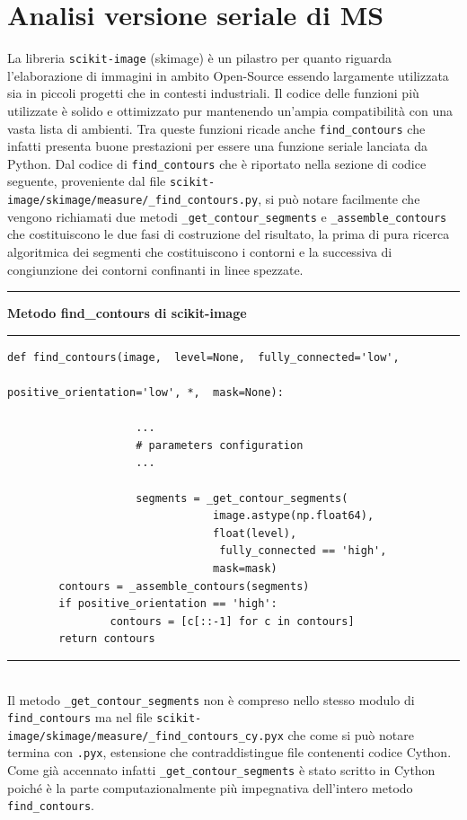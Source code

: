 \documentclass[12pt,a4paper]{report}
\begin{document}
\section{Analisi versione seriale di MS}
La libreria \verb|scikit-image| (skimage) è un pilastro per quanto riguarda l'elaborazione di immagini in ambito Open-Source essendo largamente utilizzata sia in piccoli progetti che in contesti industriali.  Il codice delle funzioni più utilizzate è solido e ottimizzato pur mantenendo un'ampia compatibilità con una vasta lista di ambienti. 
Tra queste funzioni ricade anche \verb|find_contours| che infatti presenta buone prestazioni per essere una funzione seriale lanciata da Python.\newline
Dal codice di \verb|find_contours| che è riportato nella sezione di codice seguente, proveniente dal file \verb|scikit-image/skimage/measure/_find_contours.py|, si può notare facilmente che vengono richiamati due metodi \verb|_get_contour_segments| e \verb|_assemble_contours| che costituiscono le due fasi di costruzione del risultato, la prima di pura ricerca algoritmica dei segmenti che costituiscono i contorni e la successiva di congiunzione dei contorni confinanti in linee spezzate. \\[10pt]
\noindent\rule[0.5ex]{\linewidth}{2pt}
\small{\textbf{Metodo find\_contours di scikit-image}} \\
\noindent\rule[0.5ex]{\linewidth}{1pt}
\begin{lstlisting}
def find_contours(image,  level=None,  fully_connected='low', 
																		positive_orientation='low', *,  mask=None):

					...
					# parameters configuration
					...	

					segments = _get_contour_segments(
					 			image.astype(np.float64), 
					 			float(level),
								 fully_connected == 'high', 
					 			mask=mask)
    	contours = _assemble_contours(segments)
    	if positive_orientation == 'high':
        		contours = [c[::-1] for c in contours]
    	return contours
\end{lstlisting}
\noindent\rule[0.5ex]{\linewidth}{1pt} \\[10pt]
Il metodo \verb|_get_contour_segments| non è compreso nello stesso modulo di  \verb|find_contours| ma nel file \verb|scikit-image/skimage/measure/_find_contours_cy.pyx| che come si può notare termina con \verb|.pyx|, estensione che contraddistingue file contenenti codice Cython.  Come già accennato infatti \verb|_get_contour_segments| è stato scritto in Cython poiché è la parte computazionalmente più impegnativa dell'intero metodo \verb|find_contours|.  \newline
\end{document}
